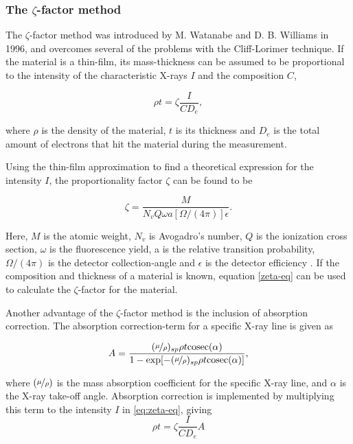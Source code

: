 		\subsubsection{The $\zeta$-factor method}
The $\zeta$-factor method was introduced by M. Watanabe and D. B. Williams in 1996, and overcomes several of the problems with the Cliff-Lorimer technique. If the material is a thin-film, its mass-thickness can be assumed to be proportional to the intensity of the characteristic X-rays $I$ and the composition $C$,

\begin{equation}
\label{eq:zeta-eq}
\rho t = \zeta \frac{I}{C D_e},
\end{equation}

where $\rho$ is the density of the material, $t$ is its thickness and $D_e$ is the total amount of electrons that hit the material during the measurement. 

Using the thin-film approximation to find a theoretical expression for the intensity $I$, the proportionality factor $\zeta$ can be found to be

\begin{equation}
\label{eq:zeta= }
\zeta = \dfrac{M}{N_v Q \omega a [\Omega/(4\pi)]\epsilon}.
\end{equation}

Here, $M$ is the atomic weight, $N_v$ is Avogadro's number, $Q$ is the ionization cross section, $\omega$ is the fluorescence yield, a is the relative transition probability, $\Omega/(4\pi)$ is the detector collection-angle and $\epsilon$ is the detector efficiency \cite{zeta-method}. If the composition and thickness of a material is known, equation \eqref{zeta-eq} can be used to calculate the $\zeta$-factor for the material.

Another advantage of the $\zeta$-factor method is the inclusion of absorption correction. The absorption correction-term for a specific X-ray line is given as

\begin{equation}
A = \frac{(\nicefrac{\mu}{\rho})_{sp} \rho t \mathrm{cosec} (\alpha)}{1-\exp[-(\nicefrac{\mu}{\rho})_{sp}\rho t \mathrm{cosec} (\alpha)]},
\label{eq:Abs-corr}
\end{equation}

where $(\nicefrac{\mu}{\rho})$ is the mass absorption coefficient for the specific X-ray line, and $\alpha$ is the X-ray take-off angle. Absorption correction is implemented by multiplying this term to the intensity $I$ in \cref{eq:zeta-eq}, giving 
\begin{equation}
\rho t = \zeta \frac{I}{C D_e} A
\end{equation}

